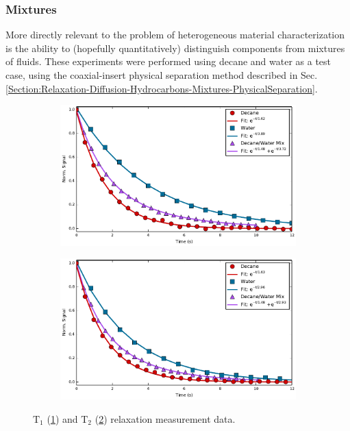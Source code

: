 \documentclass[PaulGanssle-Thesis.tex]{subfiles}
\begin{document}
\label{Section:Relaxation-Diffusion-Hydrocarbons-Results-Pure-Solvents}
\subsubsection{Mixtures}
\label{Section:Relaxation-Diffusion-Hydrocarbons-Results-Mixtures}
More directly relevant to the problem of heterogeneous material characterization is the ability to (hopefully quantitatively) distinguish components from mixtures of fluids. These experiments were performed using decane and water as a test case, using the coaxial-insert physical separation method described in Sec. \ref{Section:Relaxation-Diffusion-Hydrocarbons-Mixtures-PhysicalSeparation}. 

\begin{figure}[h!]
\centering
    \begin{subfigure}[t]{0.48\tw}
        \centering
        \includegraphics[width=\textwidth]{figures/relaxometry/decane-water-t1.pdf}
        \caption{}
        \label{fig:Decane-Water-T1-Data}
    \end{subfigure}
    \begin{subfigure}[t]{0.48\tw}
        \centering
        \includegraphics[width=\textwidth]{figures/relaxometry/decane-water-t2.pdf}
        \caption{}
        \label{fig:Decane-Water-T2-Data}
    \end{subfigure}

    \caption{$\mathrm{T}_{1}$ (\ref{fig:Decane-Water-T1-Data}) and $\mathrm{T}_{2}$ (\ref{fig:Decane-Water-T2-Data}) relaxation measurement data.}
    \label{fig:Decane-Water-Relaxation-Data}
\end{figure}
\end{document}
